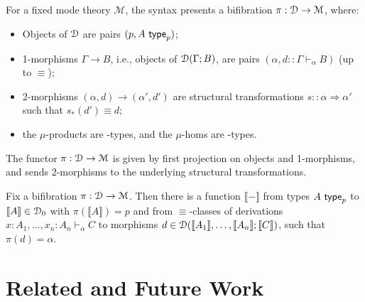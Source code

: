 \documentclass[a4paper,USenglish,numberwithinsect]{lipics-v2016}
\newcommand\deq{\ensuremath{\equiv}}
\newcommand\spr{\ensuremath{\Rightarrow}} %
\newcommand\seq[3]{\ensuremath{#1 \vdash_{#2} #3}}
\newcommand\Fsymb[0]{\dsd{F}}
\newcommand\Usymb[0]{\dsd{U}}
\newcommand\wftype[2]{\ensuremath{#1 \,\, \dsd{type}_{#2}}}
\def\M{\mathcal{M}}
\def\llb{\llbracket}
\def\rrb{\rrbracket}
\newcommand\Trd[2]{\ensuremath{#1_*(#2)}}
\begin{document}
\begin{theorem}
For a fixed mode theory $\M$, the syntax presents a bifibration $\pi : \cD \to \M$, where:
\begin{itemize}
\item Objects of $\mathcal{D}$ are pairs $(p, \wftype{A}{p})$;
\item 1-morphisms $\Gamma \to B$, i.e., objects of $\mathcal{D}(\Gamma; B)$, are pairs $(\alpha, d :: \seq{\Gamma}{\alpha}{B})$ (up to \deq); 
\item 2-morphisms $(\alpha, d) \to (\alpha', d')$ are structural
  transformations $s :: \alpha \spr \alpha'$ such that $\Trd{s}{d'} \deq d$;
\item the $\mu$-products are \Fsymb-types, and the $\mu$-homs are \Usymb-types.
\end{itemize}
The functor $\pi : \cD \to \M$ is given by first projection on objects and 1-morphisms, and sends 2-morphisms to the underlying structural transformations.
\end{theorem}

\begin{theorem}
Fix a bifibration $\pi : \cD \to \M$.  Then there is a function $\llb -
\rrb$ from types \wftype{A}{p} to $\llb A \rrb \in \cD_0$ with $\pi(\llb
A \rrb) = p$ and from $\deq$-classes of derivations $\seq{x:A_1, \ldots,
  x_n:A_n}{\alpha}{C}$ to morphisms $d \in \cD(\llb A_1 \rrb, \dots, \llb
A_n \rrb; \llb C \rrb)$, such that $\pi(d) = \alpha$.
\end{theorem}


\section{Related and Future Work}
\end{document}
